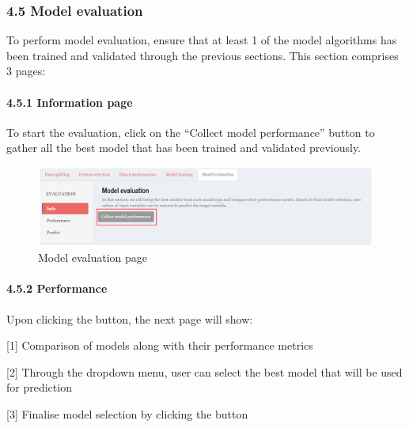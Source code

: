\documentclass[
  12pt,
]{article}
\begin{document}
\hypertarget{model-evaluation}{%
\subsubsection{4.5 Model evaluation}\label{model-evaluation}}

To perform model evaluation, ensure that at least 1 of the model
algorithms has been trained and validated through the previous sections.
This section comprises 3 pages:

\hypertarget{information-page}{%
\paragraph{4.5.1 Information page}\label{information-page}}

To start the evaluation, click on the ``Collect model performance''
button to gather all the best model that has been trained and validated
previously.

\begin{figure}[H]

{\centering \includegraphics[width=0.95\linewidth]{images/mdleval1} 

}

\caption{Model evaluation page}\label{fig:unnamed-chunk-34}
\end{figure}

\hypertarget{performance}{%
\paragraph{4.5.2 Performance}\label{performance}}

Upon clicking the button, the next page will show:

{[}1{]} Comparison of models along with their performance metrics

{[}2{]} Through the dropdown menu, user can select the best model that
will be used for prediction

{[}3{]} Finalise model selection by clicking the button
\end{document}
